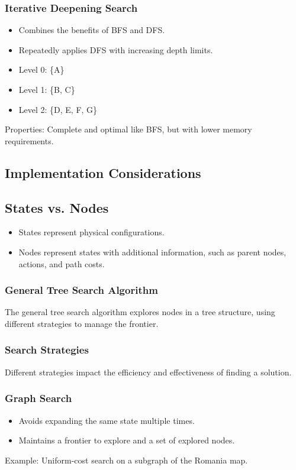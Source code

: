 \documentclass[8pt]{article}
\begin{document}
\subsubsection{Iterative Deepening Search}
\begin{itemize}
    \item Combines the benefits of BFS and DFS.
    \item Repeatedly applies DFS with increasing depth limits.
    \item Level 0: \{A\}
    \item Level 1: \{B, C\}
    \item Level 2: \{D, E, F, G\}
\end{itemize}
Properties: Complete and optimal like BFS, but with lower memory requirements.
\newpage
\subsection{Implementation Considerations}
\subsection*{States vs. Nodes}
\begin{itemize}
    \item States represent physical configurations.
    \item Nodes represent states with additional information, such as parent nodes, actions, and path costs.
\end{itemize}

\subsubsection{General Tree Search Algorithm}
The general tree search algorithm explores nodes in a tree structure, using different strategies to manage the frontier.

\subsubsection{Search Strategies}
Different strategies impact the efficiency and effectiveness of finding a solution.

\subsubsection{Graph Search}
\begin{itemize}
    \item Avoids expanding the same state multiple times.
    \item Maintains a frontier to explore and a set of explored nodes.
\end{itemize}
Example: Uniform-cost search on a subgraph of the Romania map.
\end{document}
